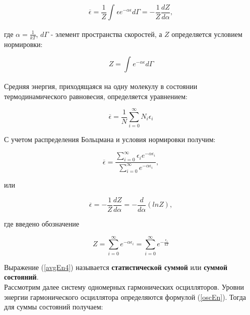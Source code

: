 \begin{equation}
    \overline\epsilon = \frac {1}{Z} \displaystyle\int_{}^{}\epsilon e^{-\alpha\epsilon} d\Gamma = - \frac {1}{Z} \frac {dZ}{d\alpha},
    \label{Bolc1}
\end{equation}

где $ \alpha = \frac {1}{kT} $, $ d\Gamma $ - элемент пространства скоростей, а $ Z $ определяется условием нормировки:

\begin{equation}
    Z = \displaystyle\int_{}^{}e^{-\alpha\epsilon} d\Gamma
    \label{Bolc2}
\end{equation}

Средняя энергия, приходящаяся на одну молекулу в состоянии термодинамического равновесия, определяется уравнением:

\begin{equation}
    \overline\epsilon = \frac {1}{N} \displaystyle\sum_{i = 0}^{\infty}N_i\epsilon_i
    \label{avgEn1}
\end{equation}

С учетом распределения Больцмана и условия нормировки получим:

\begin{equation}
    \overline\epsilon = \frac {\displaystyle\sum_{i = 0}^{\infty}\epsilon_i e^{-\alpha\epsilon_i}} {\displaystyle\sum_{i = 0}^{\infty} e^{-\alpha\epsilon_i}},
    \label{avgEn2}
\end{equation}

или

\begin{equation}
    \overline\epsilon = - \frac {1}{Z} \frac {dZ}{d\alpha} = - \frac {d}{d\alpha} \left( ln Z \right),
    \label{avgEn3}
\end{equation}

где введено обозначение

\begin{equation}
    Z = \displaystyle\sum_{i = 0}^{\infty} e^{-\alpha\epsilon_i} = \displaystyle\sum_{i = 0}^{\infty} e^{-\frac {\epsilon_i}{kT}}
    \label{avgEn4}
\end{equation}

Выражение (\ref {avgEn4}) называется \textbf {статистической суммой} или \textbf {суммой состояний}. \\ [0.2cm]

Рассмотрим далее систему одномерных гармонических осцилляторов. Уровни энергии гармонического осциллятора определяются формулой (\ref {oscEn}). Тогда для суммы состояний получаем:

